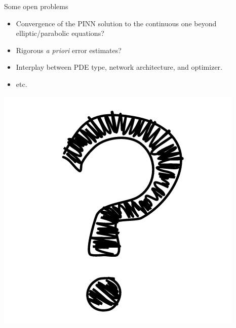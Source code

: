 \documentclass[aspectratio=169,compress,12pt,dvipsnames]{beamer}
\begin{document}
\begin{frame}{Some open problems}
  \vfill
  \begin{minipage}{.68\textwidth}
    \begin{itemize}
      \item Convergence of the PINN solution to the continuous one beyond elliptic/parabolic equations?
        \par
      \item Rigorous \emph{a priori} error estimates?
        \par
      \item Interplay between PDE type, network architecture, and optimizer.
        \par
      \item etc.
    \end{itemize}
  \end{minipage}%
  \hfill
  \begin{minipage}{.28\textwidth}
    \centering
    \includegraphics[width=\textwidth]{question.png}
  \end{minipage}
  \vfill
\end{frame}
\end{document}
